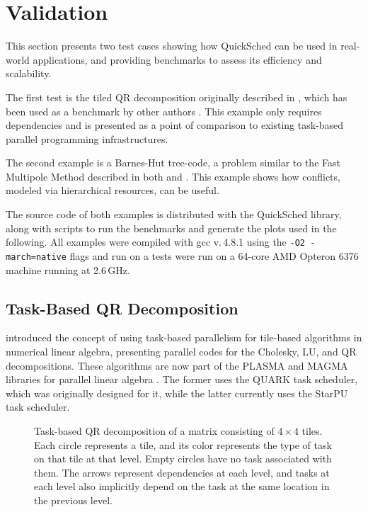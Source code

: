 \documentclass[preprint]{elsarticle}
\begin{document}
\section{Validation}

This section presents two test cases showing
how QuickSched can be used in real-world applications, and
providing benchmarks to assess its efficiency and scalability.

The first test is the tiled QR decomposition originally
described in \cite{ref:Buttari2009}, which has been used as a benchmark
by other authors \cite{ref:Agullo2009b,ref:Badia2009,ref:Bosilca2012}.
This example only requires dependencies and is presented 
as a point of comparison to existing task-based parallel
programming infrastructures.

The second example is a Barnes-Hut tree-code, a problem
similar to the Fast Multipole Method described in both
\cite{ref:Ltaief2012} and \cite{ref:Agullo2013}.
This example shows how conflicts, modeled
via hierarchical resources, can be useful.

The source code of both examples is distributed with the
QuickSched library, along with scripts to run the benchmarks
and generate the plots used in the following.
All examples were compiled with gcc v.\,4.8.1 using the
{\tt -O2 -march=native} flags and run on a 
tests were run on a 64-core AMD Opteron 6376 machine running
at 2.6\,GHz.


\subsection{Task-Based QR Decomposition}

\cite{ref:Buttari2009} introduced the concept of using task-based
parallelism for tile-based algorithms in numerical linear algebra,
presenting parallel codes for the Cholesky, LU, and QR
decompositions.
These algorithms are now part of the PLASMA and MAGMA
libraries for parallel linear algebra \cite{ref:Agullo2009}.
The former uses the QUARK task scheduler, which was originally
designed for it, while the latter currently uses the StarPU
task scheduler.

\begin{figure}
    \centerline{}
    \caption{Task-based QR decomposition of a matrix consisting
        of $4\times 4$ tiles.
        Each circle represents a tile, and its color represents
        the type of task on that tile at that level.
        Empty circles have no task associated with them.
        The arrows represent dependencies at each level, and
        tasks at each level also implicitly depend on the
        task at the same location in the previous level.}
    \label{fig:QR}
\end{figure}
\end{document}
